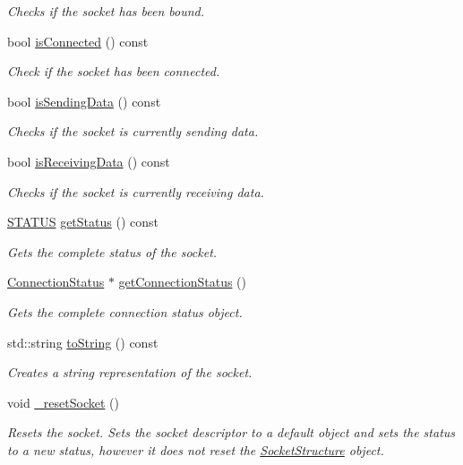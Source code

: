 \begin{DoxyCompactItemize}
\begin{DoxyCompactList}\small\item\em Checks if the socket has been bound. \end{DoxyCompactList}\item 
bool \hyperlink{class_communication_1_1base_socket_a64d75f4245795544666610e6b67ecb12}{is\+Connected} () const 
\begin{DoxyCompactList}\small\item\em Check if the socket has been connected. \end{DoxyCompactList}\item 
bool \hyperlink{class_communication_1_1base_socket_a636198498cbb8773cc9461a5ee33089b}{is\+Sending\+Data} () const 
\begin{DoxyCompactList}\small\item\em Checks if the socket is currently sending data. \end{DoxyCompactList}\item 
bool \hyperlink{class_communication_1_1base_socket_aa9b1a3ba74c7754dec0ae45767798f95}{is\+Receiving\+Data} () const 
\begin{DoxyCompactList}\small\item\em Checks if the socket is currently receiving data. \end{DoxyCompactList}\item 
\hyperlink{namespace_communication_a8dc059cf785da5e0d245141c4f8a6a9c}{S\+T\+A\+T\+U\+S} \hyperlink{class_communication_1_1base_socket_a87c909591d9b6c3259e478845d8a0b82}{get\+Status} () const 
\begin{DoxyCompactList}\small\item\em Gets the complete status of the socket. \end{DoxyCompactList}\item 
\hyperlink{class_communication_1_1_connection_status}{Connection\+Status} $\ast$ \hyperlink{class_communication_1_1base_socket_aab7f6e7eb9eed4e7b6e2ac39db1e777e}{get\+Connection\+Status} ()
\begin{DoxyCompactList}\small\item\em Gets the complete connection status object. \end{DoxyCompactList}\item 
std\+::string \hyperlink{class_communication_1_1base_socket_ad20fc9f3e205dbbcb4936e2a2ab351cb}{to\+String} () const 
\begin{DoxyCompactList}\small\item\em Creates a string representation of the socket. \end{DoxyCompactList}\item 
void \hyperlink{class_communication_1_1base_socket_aaee790fa1e870f007839f2310152f4f7}{\+\_\+reset\+Socket} ()
\begin{DoxyCompactList}\small\item\em Resets the socket. Sets the socket descriptor to a default object and sets the status to a new status, however it does not reset the \hyperlink{class_communication_1_1_socket_structure}{Socket\+Structure} object. \end{DoxyCompactList}\end{DoxyCompactItemize}
